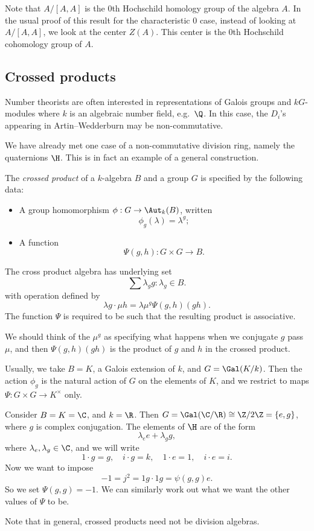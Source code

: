 \documentclass[a4paper]{article}
\begin{document}
Note that $A/[A, A]$ is the $0$th Hochschild homology group of the algebra $A$. In the usual proof of this result for the characteristic $0$ case, instead of looking at $A/[A, A]$, we look at the center $Z(A)$. This center is the $0$th Hochschild cohomology group of $A$.

\subsection{Crossed products}
Number theorists are often interested in representations of Galois groups and $kG$-modules where $k$ is an algebraic number field, e.g.\ $\Q$. In this case, the $D_i$'s appearing in Artin--Wedderburn may be non-commutative.

We have already met one case of a non-commutative division ring, namely the quaternions $\H$. This is in fact an example of a general construction.

\begin{defi}
  The \emph{crossed product} of a $k$-algebra $B$ and a group $G$ is specified by the following data:
  \begin{itemize}
    \item A group homomorphism $\phi: G \to \Aut_k(B)$, written
      \[
        \phi_g(\lambda) = \lambda^g;
      \]
    \item A function
      \[
        \Psi(g, h): G \times G \to B.
      \]
  \end{itemize}
  The cross product algebra has underlying set
  \[
    \sum \lambda_g g: \lambda_g \in B.
  \]
  with operation defined by
  \[
    \lambda g \cdot \mu h = \lambda \mu^g \Psi(g, h) (gh).
  \]
  The function $\Psi$ is required to be such that the resulting product is associative.
\end{defi}
We should think of the $\mu^g$ as specifying what happens when we conjugate $g$ pass $\mu$, and then $\Psi(g, h) (gh)$ is the product of $g$ and $h$ in the crossed product.

Usually, we take $B = K$, a Galois extension of $k$, and $G = \Gal(K/k)$. Then the action $\phi_g$ is the natural action of $G$ on the elements of $K$, and we restrict to maps $\Psi: G \times G \to K^\times$ only.

\begin{eg}
  Consider $B = K = \C$, and $k = \R$. Then $G = \Gal(\C/\R) \cong \Z/2\Z = \{e, g\}$, where $g$ is complex conjugation. The elements of $\H$ are of the form
  \[
    \lambda_e e + \lambda_g g,
  \]
  where $\lambda_e, \lambda_g \in \C$, and we will write
  \[
    1 \cdot g = g,\quad i \cdot g = k,\quad 1 \cdot e = 1,\quad i \cdot e = i.
  \]
  Now we want to impose
  \[
    -1 = j^2 = 1g \cdot 1g = \psi(g, g) e.
  \]
  So we set $\Psi(g, g) = -1$. We can similarly work out what we want the other values of $\Psi$ to be. %
\end{eg}
Note that in general, crossed products need not be division algebras.
\end{document}
